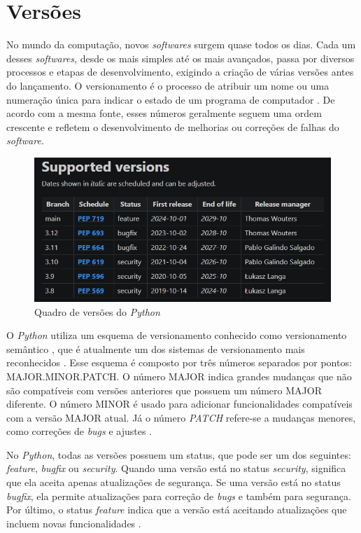 
\section{Versões}

No mundo da computação, novos \textit{softwares} surgem quase todos os dias. Cada um desses \textit{softwares}, desde os mais simples até os mais avançados, passa por diversos processos e etapas de desenvolvimento, exigindo a criação de várias versões antes do lançamento. O versionamento é o processo de atribuir um nome ou uma numeração única para indicar o estado de um programa de computador \cite{wikipedia_versionamento}. De acordo com a mesma fonte, esses números geralmente seguem uma ordem crescente e refletem o desenvolvimento de melhorias ou correções de falhas do \textit{software}.

\begin{figure}
    \centering
    \includegraphics[width=0.5\linewidth]{Photos/Versoes-do-Python-4.png}
    \caption{Quadro de versões do \textit{Python} \cite{hashtagtreinamentos_python_versions}}
    \label{fig:enter-label}
\end{figure}

O \textit{Python} utiliza um esquema de versionamento conhecido como versionamento semântico \cite{hashtagtreinamentos_python_versions}, que é atualmente um dos sistemas de versionamento mais reconhecidos \cite{wikipedia_versionamento}. Esse esquema é composto por três números separados por pontos: MAJOR.MINOR.PATCH. O número MAJOR indica grandes mudanças que não são compatíveis com versões anteriores que possuem um número MAJOR diferente. O número MINOR é usado para adicionar funcionalidades compatíveis com a versão MAJOR atual. Já o número \textit{PATCH} refere-se a mudanças menores, como correções de \textit{bugs} e ajustes \cite{wikipedia_versionamento}.

No \textit{Python}, todas as versões possuem um status, que pode ser um dos seguintes: \textit{feature}, \textit{bugfix} ou \textit{security}. Quando uma versão está no status \textit{security}, significa que ela aceita apenas atualizações de segurança. Se uma versão está no status \textit{bugfix}, ela permite atualizações para correção de \textit{bugs} e também para segurança. Por último, o status \textit{feature} indica que a versão está aceitando atualizações que incluem novas funcionalidades \cite{hashtagtreinamentos_python_versions}.


